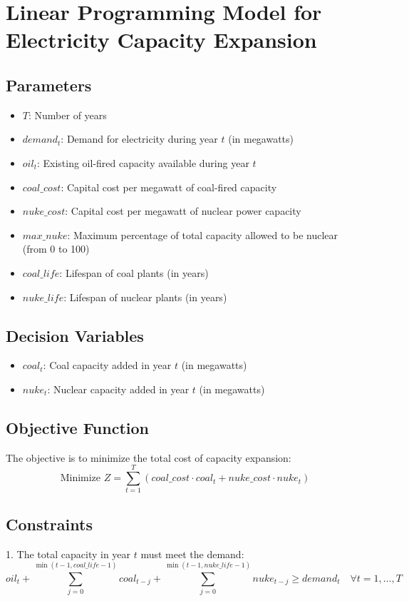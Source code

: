 \documentclass{article}
\begin{document}
\section*{Linear Programming Model for Electricity Capacity Expansion}

\subsection*{Parameters}
\begin{itemize}
    \item $T$: Number of years
    \item $demand_t$: Demand for electricity during year $t$ (in megawatts)
    \item $oil_t$: Existing oil-fired capacity available during year $t$
    \item $coal\_cost$: Capital cost per megawatt of coal-fired capacity
    \item $nuke\_cost$: Capital cost per megawatt of nuclear power capacity
    \item $max\_nuke$: Maximum percentage of total capacity allowed to be nuclear (from 0 to 100)
    \item $coal\_life$: Lifespan of coal plants (in years)
    \item $nuke\_life$: Lifespan of nuclear plants (in years)
\end{itemize}

\subsection*{Decision Variables}
\begin{itemize}
    \item $coal_t$: Coal capacity added in year $t$ (in megawatts)
    \item $nuke_t$: Nuclear capacity added in year $t$ (in megawatts)
\end{itemize}

\subsection*{Objective Function}
The objective is to minimize the total cost of capacity expansion:
\[
\text{Minimize } Z = \sum_{t=1}^{T} (coal\_cost \cdot coal_t + nuke\_cost \cdot nuke_t)
\]

\subsection*{Constraints}
1. The total capacity in year $t$ must meet the demand:
\[
oil_t + \sum_{j=0}^{\min(t-1, coal\_life-1)} coal_{t-j} + \sum_{j=0}^{\min(t-1, nuke\_life-1)} nuke_{t-j} \geq demand_t \quad \forall t = 1, \ldots, T
\]
\end{document}
